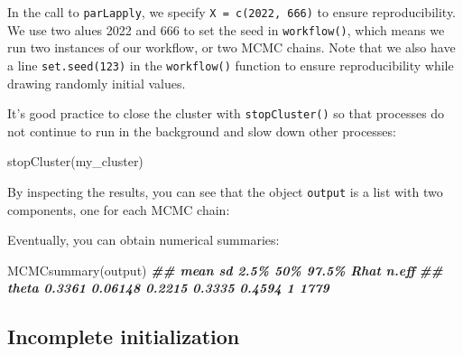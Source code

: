 \documentclass[
  12pt,
]{krantz}
\newenvironment{Shaded}{\begin{snugshade}}{\end{snugshade}}
\newcommand{\DocumentationTok}[1]{\textcolor[rgb]{0.56,0.35,0.01}{\textbf{\textit{#1}}}}
\newcommand{\FunctionTok}[1]{\textcolor[rgb]{0.00,0.00,0.00}{#1}}
\newcommand{\NormalTok}[1]{#1}
\begin{document}
In the call to \texttt{parLapply}, we specify \texttt{X\ =\ c(2022,\ 666)} to ensure reproducibility. We use two alues 2022 and 666 to set the seed in \texttt{workflow()}, which means we run two instances of our workflow, or two MCMC chains. Note that we also have a line \texttt{set.seed(123)} in the \texttt{workflow()} function to ensure reproducibility while drawing randomly initial values.

It's good practice to close the cluster with \texttt{stopCluster()} so that processes do not continue to run in the background and slow down other processes:

\begin{Shaded}
\begin{Highlighting}[]
\FunctionTok{stopCluster}\NormalTok{(my\_cluster)}
\end{Highlighting}
\end{Shaded}

By inspecting the results, you can see that the object \texttt{output} is a list with two components, one for each MCMC chain:

\begin{Shaded}
\end{Shaded}

Eventually, you can obtain numerical summaries:

\begin{Shaded}
\begin{Highlighting}[]
\FunctionTok{MCMCsummary}\NormalTok{(output)}
\DocumentationTok{\#\#         mean      sd   2.5\%    50\%  97.5\% Rhat n.eff}
\DocumentationTok{\#\# theta 0.3361 0.06148 0.2215 0.3335 0.4594    1  1779}
\end{Highlighting}
\end{Shaded}

\hypertarget{incomplete-initialization}{%
\subsection{Incomplete initialization}\label{incomplete-initialization}}
\end{document}
